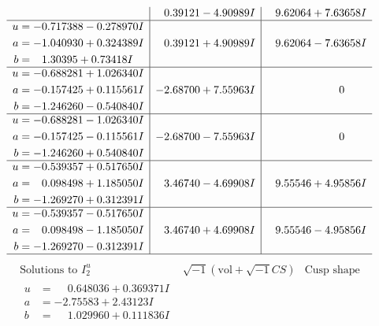 \documentclass[1p]{elsarticle_modified}
\theoremstyle{definition}
\newcommand{\I}{\sqrt{-1}}
\begin{document}
$$\begin{array}{c|c|c}
 & \phantom{-}0.39121 - 4.90989 I & \phantom{-}9.62064 + 7.63658 I \\ \hline\begin{aligned}
u &= -0.717388 - 0.278970 I \\
a &= -1.040930 + 0.324389 I \\
b &= \phantom{-}1.30395 + 0.73418 I\end{aligned}
 & \phantom{-}0.39121 + 4.90989 I & \phantom{-}9.62064 - 7.63658 I \\ \hline\begin{aligned}
u &= -0.688281 + 1.026340 I \\
a &= -0.157425 + 0.115561 I \\
b &= -1.246260 - 0.540840 I\end{aligned}
 & -2.68700 + 7.55963 I & \phantom{-0.000000 } 0 \\ \hline\begin{aligned}
u &= -0.688281 - 1.026340 I \\
a &= -0.157425 - 0.115561 I \\
b &= -1.246260 + 0.540840 I\end{aligned}
 & -2.68700 - 7.55963 I & \phantom{-0.000000 } 0 \\ \hline\begin{aligned}
u &= -0.539357 + 0.517650 I \\
a &= \phantom{-}0.098498 + 1.185050 I \\
b &= -1.269270 + 0.312391 I\end{aligned}
 & \phantom{-}3.46740 - 4.69908 I & \phantom{-}9.55546 + 4.95856 I \\ \hline\begin{aligned}
u &= -0.539357 - 0.517650 I \\
a &= \phantom{-}0.098498 - 1.185050 I \\
b &= -1.269270 - 0.312391 I\end{aligned}
 & \phantom{-}3.46740 + 4.69908 I & \phantom{-}9.55546 - 4.95856 I\\
 \hline 
 \end{array}$$\newpage$$\begin{array}{c|c|c}  
\text{Solutions to }I^u_{2}& \I (\text{vol} + \sqrt{-1}CS) & \text{Cusp shape}\\
 \hline 
\begin{aligned}
u &= \phantom{-}0.648036 + 0.369371 I \\
a &= -2.75583 + 2.43123 I \\
b &= \phantom{-}1.029960 + 0.111836 I\end{aligned}

\end{array}$$
\end{document}
